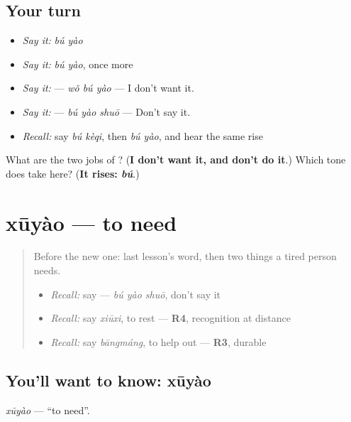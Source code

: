 \subsection*{Your turn}
\begin{itemize}
\raggedright
  \item \emph{Say it:} \emph{bú yào}
  \item \emph{Say it:} \emph{bú yào}, once more
  \item \emph{Say it:}  — \emph{wǒ bú yào} — I don't want it.
  \item \emph{Say it:}  — \emph{bú yào shuō} — Don't say it.
  \item \emph{Recall:} say \emph{bú kèqi}, then \emph{bú yào}, and hear the same rise
\end{itemize}

\begin{tcolorbox}[breakable,colback=teal!4,colframe=teal!35!black,title={Before you move on}]
What are the two jobs of ? (\textbf{I don't want it, and don't do it}.) Which tone does  take here? (\textbf{It rises: \emph{bú}}.)
\end{tcolorbox}
\section[xūyào]{xūyào — to need}

\label{lesson:ZH-C91-xuyao}



\begin{quote}
Before the new one: last lesson's word, then two things a tired person needs.

\begin{itemize}
\raggedright
  \item \emph{Recall:} say  — \emph{bú yào shuō}, don't say it
  \item \emph{Recall:} say \emph{xiūxi}, to rest — \textbf{R4}, recognition at distance
  \item \emph{Recall:} say \emph{bāngmáng}, to help out — \textbf{R3}, durable
\end{itemize}
\end{quote}

\subsection*{You'll want to know: xūyào}
\emph{xūyào} — \textquotedblleft{}to need\textquotedblright{}.

